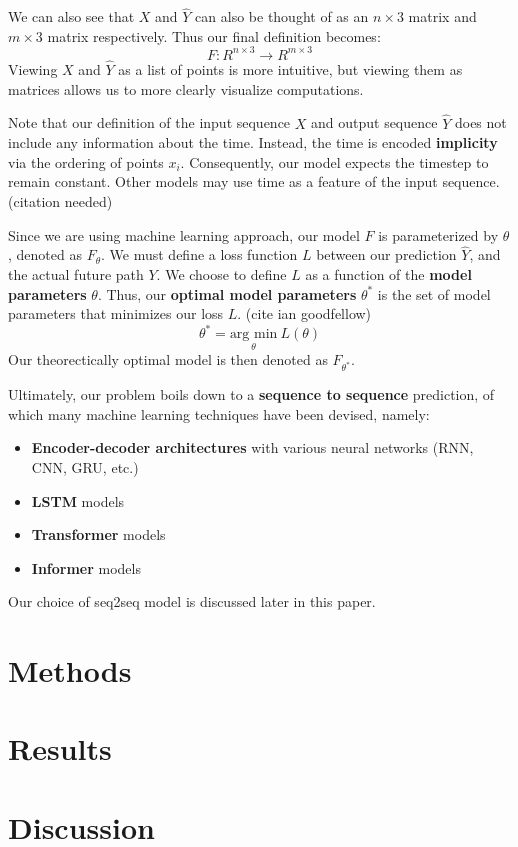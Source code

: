 \documentclass{article}
\begin{document}
We can also see that $X$ and $\hat{Y}$ can also be thought of as an $n \times 3$
matrix and $m \times 3$ matrix respectively. Thus our final definition becomes:
$$ F: R^{n \times 3} \to R^{m \times 3} $$
Viewing $X$ and $\hat{Y}$ as a list of points is more intuitive, but viewing 
them as matrices allows us to more clearly visualize computations.

Note that our definition of the input sequence $X$ and output sequence $\hat{Y}$ 
does not include any information about the time. Instead, the time is encoded
\textbf{implicity} via the ordering of points $x_i$. Consequently, our model
expects the timestep to remain constant. Other models may use time as a feature
of the input sequence. (citation needed)

Since we are using machine learning approach, our model $F$ is parameterized by
$\theta$, denoted as $F_{\theta}$. We must define a loss function $L$
between our prediction $\hat{Y}$, and the actual future path $Y$. We choose to 
define $L$ as a function of the \textbf{model parameters} $\theta$. Thus, our 
\textbf{optimal model parameters} $\theta^*$ is the set of model parameters that 
minimizes our loss $L$. (cite ian goodfellow)
$$ \theta^* = \underset{\theta}{\text{arg min}}\  L(\theta)$$
Our theorectically optimal model is then denoted as $F_{\theta^*}$.

Ultimately, our problem boils down to a \textbf{sequence to sequence} prediction, 
of which many machine learning techniques have been devised, namely:
\begin{itemize}
    \item {
        \textbf{Encoder-decoder architectures} with various neural networks 
        (RNN, CNN, GRU, etc.)
    }
    \item {
        \textbf{LSTM} models
    }
    \item {
        \textbf{Transformer} models
    }
    \item {
        \textbf{Informer} models
    }
\end{itemize}
Our choice of seq2seq model is discussed later in this paper.

\section{Methods}
\section{Results}
\section{Discussion}
\end{document}
